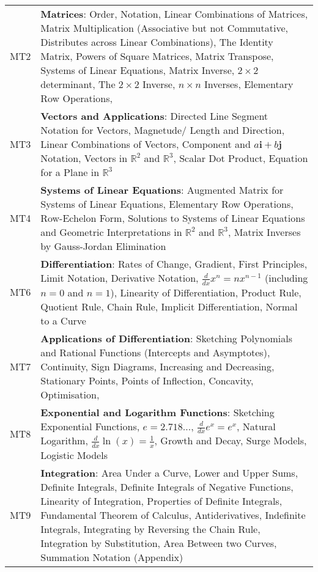 \documentclass[varwidth=144mm, 12pt]{standalone}
\begin{document}
\begin{longtable}{lp{}}
MT2 & \textbf{Matrices}: Order, Notation, Linear Combinations of Matrices, Matrix Multiplication (Associative but not Commutative, Distributes across Linear Combinations), The Identity Matrix, Powers of Square Matrices, Matrix Transpose, Systems of Linear Equations, Matrix Inverse, $2 \times 2$ determinant, The $2 \times 2$ Inverse, $n \times n$ Inverses, Elementary Row Operations, \\
MT3 & \textbf{Vectors and Applications}: Directed Line Segment Notation for Vectors, Magnetude/ Length and Direction, Linear Combinations of Vectors, Component and $a\mathbf{i} + b\mathbf{j}$ Notation, Vectors in $\mathbb{R}^2$ and $\mathbb{R}^3$, Scalar Dot Product, Equation for a Plane in $\mathbb{R}^3$ \\
MT4 & \textbf{Systems of Linear Equations}: Augmented Matrix for Systems of Linear Equations, Elementary Row Operations, Row-Echelon Form, Solutions to Systems of Linear Equations and Geometric Interpretations in $\mathbb{R}^2$ and $\mathbb{R}^3$, Matrix Inverses by Gauss-Jordan Elimination \\
MT6 & \textbf{Differentiation}: Rates of Change, Gradient, First Principles, Limit Notation, Derivative Notation, $\frac{d}{dx}x^n = nx^{n-1}$ (including $n = 0$ and $n = 1$), Linearity of Differentiation, Product Rule, Quotient Rule, Chain Rule, Implicit Differentiation, Normal to a Curve \\
MT7 & \textbf{Applications of Differentiation}: Sketching Polynomials and Rational Functions (Intercepts and Asymptotes), Continuity, Sign Diagrams, Increasing and Decreasing, Stationary Points, Points of Inflection, Concavity, Optimisation, \\
MT8 & \textbf{Exponential and Logarithm Functions}: Sketching Exponential Functions, $e = 2.718\hdots$, $\frac{d}{dx}e^x = e^x$, Natural Logarithm, $\frac{d}{dx}\ln(x) = \frac{1}{x}$, Growth and Decay, Surge Models, Logistic Models \\
MT9 & \textbf{Integration}: Area Under a Curve, Lower and Upper Sums, Definite Integrals, Definite Integrals of Negative Functions, Linearity of Integration, Properties of Definite Integrals, Fundamental Theorem of Calculus, Antiderivatives, Indefinite Integrals, Integrating by Reversing the Chain Rule, Integration by Substitution, Area Between two Curves, Summation Notation (Appendix) \\
\end{longtable}
\end{document}
